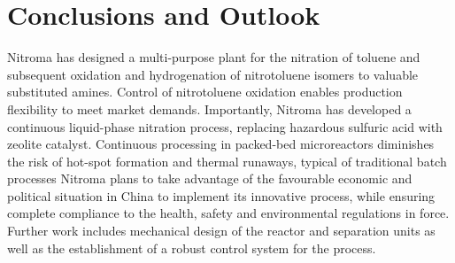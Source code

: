 \section{Conclusions and Outlook}
\label{sec:conclu}
Nitroma has designed a multi-purpose plant for the nitration of toluene and subsequent oxidation and hydrogenation of nitrotoluene isomers to valuable substituted amines.
Control of nitrotoluene oxidation enables production flexibility to meet market demands.
Importantly, Nitroma has developed a continuous liquid-phase nitration process, replacing hazardous sulfuric acid with zeolite catalyst.
Continuous processing in packed-bed microreactors diminishes the risk of hot-spot formation and thermal runaways, typical of traditional batch processes
Nitroma plans to take advantage of the favourable economic and political situation in China to implement its innovative process, while ensuring complete compliance to the health, safety and environmental regulations in force.
Further work includes mechanical design of the reactor and separation units as well as the establishment of a robust control system for the process.
